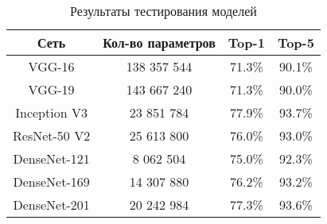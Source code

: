 \begin{table}[H]
    \centering
    \caption{Результаты тестирования моделей} \label{conv-test}
    \begin{tabular}{|c|c|c|c|}
      \hline    
      Сеть         & Кол-во параметров   & Top-1     & Top-5     \\
      \hline
      VGG-16       & 138 357 544         & 71.3\%	& 90.1\%    \\
      \hline
      VGG-19       & 143 667 240         & 71.3\%	& 90.0\%    \\
      \hline
      Inception V3 & 23 851 784          & 77.9\%	& 93.7\%    \\
      \hline
      ResNet-50 V2 & 25 613 800          & 76.0\%	& 93.0\%    \\
      \hline
      DenseNet-121 & 8 062 504           & 75.0\%	& 92.3\%    \\
      \hline
      DenseNet-169 & 14 307 880          & 76.2\%	& 93.2\%    \\
      \hline
      DenseNet-201 & 20 242 984          & 77.3\%	& 93.6\%    \\
      \hline
    \end{tabular}
  \end{table}